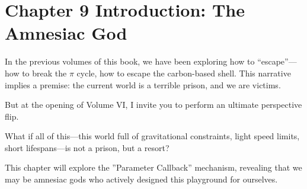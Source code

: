 \section*{Chapter 9 Introduction: The Amnesiac God}

In the previous volumes of this book, we have been exploring how to ``escape''---how to break the $\pi$ cycle, how to escape the carbon-based shell. This narrative implies a premise: the current world is a terrible prison, and we are victims.

But at the opening of Volume VI, I invite you to perform an ultimate perspective flip.

What if all of this---this world full of gravitational constraints, light speed limits, short lifespans---is not a prison, but a resort?

This chapter will explore the ''Parameter Callback'' mechanism, revealing that we may be amnesiac gods who actively designed this playground for ourselves.


